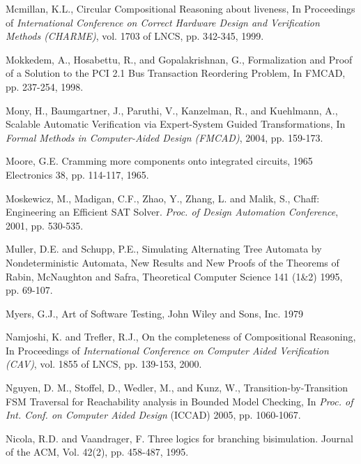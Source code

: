 {\begin{thebibliography}{99}
 Mcmillan, K.L.,
        Circular Compositional Reasoning about liveness,
        In Proceedings of {\em International Conference on Correct
        Hardware Design and Verification Methods (CHARME)},
        vol. 1703 of LNCS, pp. 342-345, 1999. 


 Mokkedem, A., Hosabettu, R., and Gopalakrishnan, G.,
        Formalization and Proof of a Solution
        to the PCI 2.1 Bus Transaction Reordering Problem,
        In FMCAD, pp. 237-254, 1998.

 Mony, H., Baumgartner, J., Paruthi, V., Kanzelman, 
	R., and Kuehlmann, A., Scalable Automatic Verification via 
	Expert-System Guided Transformations, In {\em Formal Methods in 
	Computer-Aided Design (FMCAD)}, 2004, pp. 159-173.

 Moore, G.E. Cramming more components onto integrated
	circuits, 1965 Electronics 38, pp. 114-117, 1965.

 Moskewicz, M., Madigan, C.F., Zhao, Y., Zhang, L. and 
	Malik, S.,
        Chaff: Engineering an Efficient SAT Solver. {\em Proc. of Design
	Automation Conference}, 2001,  pp. 530-535.

 Muller, D.E. and Schupp, P.E., Simulating Alternating Tree 
	Automata by Nondeterministic Automata, New Results and New Proofs of 
	the Theorems of Rabin, McNaughton and Safra, Theoretical Computer 
	Science 141 (1\&2) 1995, pp. 69-107.

 Myers, G.J., Art of Software Testing, John Wiley and 
	Sons, Inc. 1979

 Namjoshi, K. and Trefler, R.J.,
        On the completeness of Compositional Reasoning,
        In Proceedings of {\em International Conference on Computer
        Aided Verification (CAV)}, vol. 1855 of LNCS, pp. 139-153, 2000. 

 Nguyen, D. M., Stoffel, D., Wedler, M., and
        Kunz, W., Transition-by-Transition FSM Traversal
        for Reachability analysis in Bounded Model Checking,
        In {\em Proc. of Int. Conf. on Computer
	Aided Design} (ICCAD) 2005, pp. 1060-1067.

 Nicola, R.D. and Vaandrager, F. Three logics for branching
    bisimulation. Journal of the ACM, Vol. 42(2), pp. 458-487, 1995. 


\end{thebibliography}}
